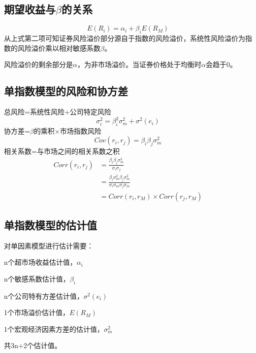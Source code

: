 \documentclass{article}
\begin{document}
\subsection{期望收益与$ \beta $的关系}
\[
E(R_i)=\alpha_i+\beta_iE(R_M)
\]
从上式第二项可知证券风险溢价部分源自于指数的风险溢价，系统性风险溢价为指数的风险溢价乘以相对敏感系数$ \beta $。

风险溢价的剩余部分是$ \alpha $，为非市场溢价。当证券价格处于均衡时$ \alpha $会趋于0。

\subsection{单指数模型的风险和协方差}
总风险=系统性风险+公司特定风险
\[
\sigma_i^2=\beta_i^2\sigma_m^2+\sigma^2(e_i)
\]
协方差=$ \beta $的乘积×市场指数风险
\[
Cov(r_i,r_j)=\beta_i\beta_j\sigma_m^2
\]
相关系数=与市场之间的相关系数之积
\begin{equation*}
	\begin{split}
	Corr(r_i,r_j)&=\frac{\beta_i\beta_j\sigma_m^2}{\sigma_i\sigma_j}\\
	&=\frac{\beta_i\sigma_m^2\beta_j\sigma_m^2}{\sigma_i\sigma_m\sigma_j\sigma_m}\\
	&=Corr(r_i,r_M)\times Corr(r_j,r_M)
	\end{split}
\end{equation*}

\subsection{单指数模型的估计值}
对单因素模型进行估计需要：

n个超市场收益估计值，$ \alpha_i $

n个敏感系数估计值，$ \beta_i $

n个公司特有方差估计值，$ \sigma^2(e_i) $

1个市场溢价估计值，$ E(R_M) $

1个宏观经济因素方差的估计值，$ \sigma_m^2 $

\hspace*{\fill}

共3n+2个估计值。
\end{document}
